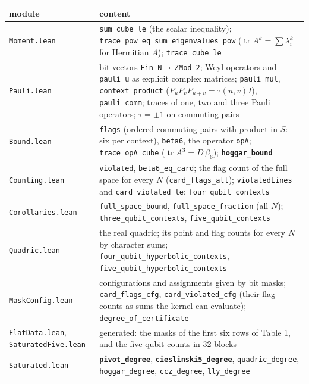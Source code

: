 \documentclass[11pt,a4paper]{article}
\begin{document}
{\def\LTcaptype{none} %
{\small
\begin{longtable}[]{@{}>{\raggedright\arraybackslash}p{}>{\raggedright\arraybackslash}p{}@{}}
\toprule\noalign{}
module & content \\
\midrule\noalign{}
\endhead
\bottomrule\noalign{}
\endlastfoot
\texttt{Moment.lean} & \texttt{sum\_cube\_le} (the scalar inequality); \nolinkurl{trace_pow_eq_sum_eigenvalues_pow} (\(\operatorname{tr}A^k = \sum \lambda_i^k\) for Hermitian \(A\)); \texttt{trace\_cube\_le} \\
\texttt{Pauli.lean} & bit vectors \texttt{Fin\ N\ →\ ZMod\ 2}; Weyl operators and \texttt{pauli\ u} as explicit complex matrices; \texttt{pauli\_mul}, \texttt{context\_product} (\(P_uP_vP_{u+v} = \tau(u,v) I\)), \texttt{pauli\_comm}; traces of one, two and three Pauli operators; \(\tau = \pm 1\) on commuting pairs \\
\texttt{Bound.lean} & \texttt{flags} (ordered commuting pairs with product in \(S\): six per context), \texttt{beta6}, the operator \texttt{opA}; \texttt{trace\_opA\_cube} (\(\operatorname{tr}A^3 = D\,\beta_6\)); \textbf{\texttt{hoggar\_bound}} \\
\texttt{Counting.lean} & \texttt{violated}, \texttt{beta6\_eq\_card}; the flag count of the full space for every \(N\) (\texttt{card\_flags\_all}); \texttt{violatedLines} and \texttt{card\_violated\_le}; \nolinkurl{four_qubit_contexts} \\
\texttt{Corollaries.lean} & \texttt{full\_space\_bound}, \nolinkurl{full_space_fraction} (all \(N\)); \nolinkurl{three_qubit_contexts}, \nolinkurl{five_qubit_contexts} \\
\texttt{Quadric.lean} & the real quadric; its point and flag counts for every \(N\) by character sums; \nolinkurl{four_qubit_hyperbolic_contexts}, \nolinkurl{five_qubit_hyperbolic_contexts} \\
\texttt{MaskConfig.lean} & configurations and assignments given by bit masks; \texttt{card\_flags\_cfg}, \texttt{card\_violated\_cfg} (their flag counts as sums the kernel can evaluate); \nolinkurl{degree_of_certificate} \\
\texttt{FlatData.lean}, \nolinkurl{SaturatedFive.lean} & generated: the masks of the first six rows of Table 1, and the five-qubit counts in 32 blocks \\
\texttt{Saturated.lean} & \textbf{\texttt{pivot\_degree}}, \textbf{\nolinkurl{cieslinski5_degree}}, \texttt{quadric\_degree}, \texttt{hoggar\_degree}, \texttt{ccz\_degree}, \texttt{lly\_degree} \\

\end{longtable}}}
\end{document}
